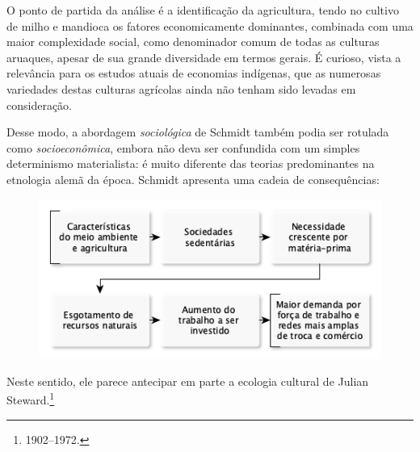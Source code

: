 O ponto de partida da análise é a identificação da agricultura, tendo no cultivo de milho e mandioca os fatores economicamente dominantes, combinada com uma maior complexidade social, como denominador comum de todas as culturas aruaques, apesar de sua grande diversidade em termos gerais. É curioso, vista a relevância para os estudos atuais de economias indígenas, que as numerosas variedades destas culturas agrícolas ainda não tenham sido levadas em consideração.

Desse modo, a abordagem \textit{sociológica} de Schmidt também podia ser
rotulada como \textit{socioeconômica}, embora não deva ser confundida com um
simples determinismo materialista: é muito diferente das teorias
predominantes na etnologia alemã da época. Schmidt apresenta uma cadeia
de consequências: 
\medskip

\begin{figure}[H]
  \includegraphics[width=\textwidth]{./TABELA.png}  
\end{figure}

\medskip
Neste sentido, ele parece antecipar em parte a
ecologia cultural de Julian Steward.\footnote{1902--1972.}

